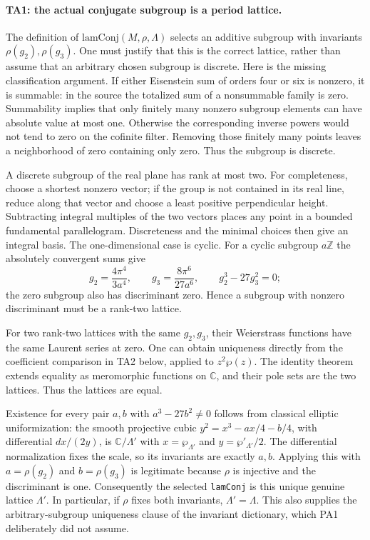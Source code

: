 \paragraph{TA1: the actual conjugate subgroup is a period lattice.}
The definition of $\mathrm{lamConj}(M,\rho,\Lambda)$ selects an
additive subgroup with invariants $\rho(g_2),\rho(g_3)$. One must
justify that this is the correct lattice, rather than assume that
an arbitrary chosen subgroup is discrete. Here is the missing
classification argument. If either Eisenstein sum of orders four
or six is nonzero, it is summable: in the source the totalized sum
of a nonsummable family is zero. Summability implies that only
finitely many nonzero subgroup elements can have absolute value
at most one. Otherwise the corresponding inverse powers would
not tend to zero on the cofinite filter. Removing those finitely
many points leaves a neighborhood of zero containing only zero.
Thus the subgroup is discrete.

A discrete subgroup of the real plane has rank at most two.
For completeness, choose a shortest nonzero vector; if the group
is not contained in its real line, reduce along that vector and
choose a least positive perpendicular height. Subtracting integral
multiples of the two vectors places any point in a bounded
fundamental parallelogram. Discreteness and the minimal choices
then give an integral basis. The one-dimensional case is cyclic.
For a cyclic subgroup $a\mathbb Z$ the absolutely convergent sums give
\[
 g_2=\frac{4\pi^4}{3a^4},\qquad
 g_3=\frac{8\pi^6}{27a^6},\qquad g_2^3-27g_3^2=0;
\]
the zero subgroup also has discriminant zero. Hence a subgroup
with nonzero discriminant must be a rank-two lattice.

For two rank-two lattices with the same $g_2,g_3$, their Weierstrass
functions have the same Laurent series at zero. One can obtain
uniqueness directly from the coefficient comparison in TA2 below,
applied to $z^2\wp(z)$. The identity theorem extends equality as
meromorphic functions on $\mathbb C$, and their pole sets are the
two lattices. Thus the lattices are equal.

Existence for every pair $a,b$ with $a^3-27b^2\ne0$ follows from
classical elliptic uniformization: the smooth projective cubic
$y^2=x^3-ax/4-b/4$, with differential $dx/(2y)$, is
$\mathbb C/\Lambda'$ with $x=\wp_{\Lambda'}$ and
$y=\wp'_{\Lambda'}/2$. The differential normalization fixes the
scale, so its invariants are exactly $a,b$. Applying this with
$a=\rho(g_2)$ and $b=\rho(g_3)$ is legitimate because $\rho$ is
injective and the discriminant is one. Consequently the selected
\texttt{lamConj} is this unique genuine lattice $\Lambda'$.
In particular, if $\rho$ fixes both invariants, $\Lambda'=\Lambda$.
This also supplies the arbitrary-subgroup uniqueness clause of
the invariant dictionary, which PA1 deliberately did not assume.

